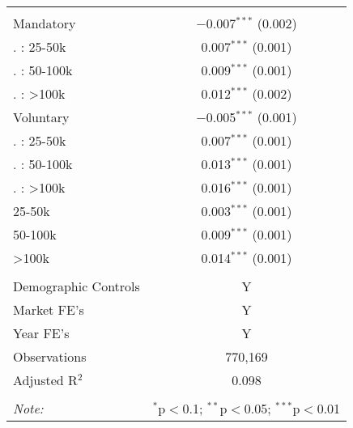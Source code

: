 
\begin{table}[!htbp] \centering 
  \caption{} 
  \label{} 
\begin{tabular}{@{\extracolsep{5pt}}lc} 
\\[-1.8ex]\hline 
\hline \\[-1.8ex] 
 Mandatory & $-$0.007$^{***}$ (0.002) \\ 
   . : 25-50k & 0.007$^{***}$ (0.001) \\ 
   . : 50-100k & 0.009$^{***}$ (0.001) \\ 
   . : >100k & 0.012$^{***}$ (0.002) \\ 
  Voluntary & $-$0.005$^{***}$ (0.001) \\ 
   . : 25-50k & 0.007$^{***}$ (0.001) \\ 
   . : 50-100k & 0.013$^{***}$ (0.001) \\ 
   . : >100k & 0.016$^{***}$ (0.001) \\ 
  25-50k & 0.003$^{***}$ (0.001) \\ 
  50-100k & 0.009$^{***}$ (0.001) \\ 
  >100k & 0.014$^{***}$ (0.001) \\ 
 \hline \\[-1.8ex] 
Demographic Controls & Y \\ 
Market FE's & Y \\ 
Year FE's & Y \\ 
Observations & 770,169 \\ 
Adjusted R$^{2}$ & 0.098 \\ 
\hline 
\hline \\[-1.8ex] 
\textit{Note:}  & \multicolumn{1}{l}{$^{*}$p$<$0.1; $^{**}$p$<$0.05; $^{***}$p$<$0.01} \\ 
\end{tabular} 
\end{table} 
